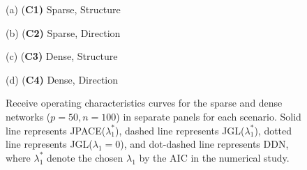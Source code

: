 \documentclass[useAMS,usenatbib,referee]{bio}
\begin{document}
{{\begin{figure}[htb!] %
\begin{center} \medskip
\begin{minipage}[b]{.48\linewidth}
  \centering   \centerline{}
  \centerline{(a) {(\bf C1)} Sparse, Structure}
\end{minipage} \medskip
\begin{minipage}[b]{.48\linewidth}
  \centering   \centerline{}
  \centerline{(b) {(\bf C2)} Sparse, Direction }
\end{minipage}
\medskip
\begin{minipage}[b]{.48\linewidth}
  \centering   \centerline{}
  \centerline{(c) {(\bf C3)} Dense, Structure}
\end{minipage}
\begin{minipage}[b]{.48\linewidth}
  \centering   \centerline{}
  \centerline{(d) {(\bf C4)} Dense, Direction}
\end{minipage}
\caption{Receive operating characteristics curves for the sparse and 
dense networks ($p=50, n=100$) in separate panels for each scenario. 
Solid line represents JPACE($\lambda_1^*$), dashed line represents
JGL($\lambda_1^*$), dotted line represents JGL($\lambda_1=0$), 
and dot-dashed line represents DDN, where $\lambda_1^*$ denote 
the chosen $\lambda_1$ by the AIC in the numerical study.}
\end{center}
\end{figure}



}}
\end{document}
